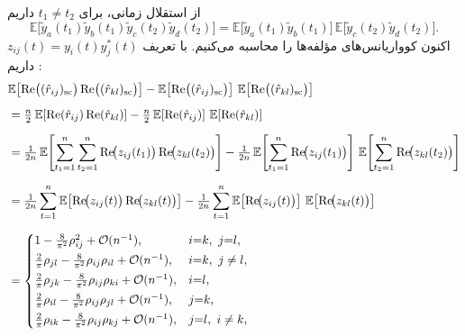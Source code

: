\begin{اثبات}
	از استقلال زمانی، برای \(t_1\neq t_2\) داریم
	\begin{equation}
		\mathbb{E}\!\big[\tilde y_a(t_1)\tilde y_b(t_1)\tilde y_c(t_2)\tilde y_d(t_2)\big]
		= \mathbb{E}\!\big[\tilde y_a(t_1)\tilde y_b(t_1)\big]\,
		\mathbb{E}\!\big[\tilde y_c(t_2)\tilde y_d(t_2)\big].
	\end{equation}
	اکنون کوواریانس‌های مؤلفه‌ها را محاسبه می‌کنیم. با تعریف \(z_{ij}(t)=y_i(t)y_j^{*}(t)\) داریم :
	\begin{align}
		&\mathbb{E}\!\left[\mathrm{Re}\big((\hat r_{ij})_{\mathrm{sc}}\big)\,
		\mathrm{Re}\big((\hat r_{kl})_{\mathrm{sc}}\big)\right]
		- \mathbb{E}\!\left[\mathrm{Re}\big((\hat r_{ij})_{\mathrm{sc}}\big)\right]\,
		\mathbb{E}\!\left[\mathrm{Re}\big((\hat r_{kl})_{\mathrm{sc}}\big)\right] \notag \\[6pt]
		&= \tfrac{n}{2}\,\mathbb{E}\!\left[\mathrm{Re}(\hat r_{ij})\,\mathrm{Re}(\hat r_{kl})\right]
		- \tfrac{n}{2}\,\mathbb{E}\!\left[\mathrm{Re}(\hat r_{ij})\right]\,
		\mathbb{E}\!\left[\mathrm{Re}(\hat r_{kl})\right] \notag \\[6pt] 
		&= \tfrac{1}{2n}\,
		\mathbb{E}\!\left[
		\sum_{t_{1}=1}^{n}\sum_{t_{2}=1}^{n}
		\mathrm{Re}\!\big(z_{ij}(t_{1})\big)\,
		\mathrm{Re}\!\big(z_{kl}(t_{2})\big)
		\right] - \tfrac{1}{2n}\,
		\mathbb{E}\!\left[\sum_{t_{1}=1}^{n}\mathrm{Re}\!\big(z_{ij}(t_{1})\big)\right]\,
		\mathbb{E}\!\left[\sum_{t_{2}=1}^{n}\mathrm{Re}\!\big(z_{kl}(t_{2})\big)\right] \notag \\[6pt]
		&= \tfrac{1}{2n}\sum_{t=1}^{n}\mathbb{E}\!\left[
		\mathrm{Re}\!\big(z_{ij}(t)\big)\,
		\mathrm{Re}\!\big(z_{kl}(t)\big)\right]
		- \tfrac{1}{2n}\sum_{t=1}^{n}\mathbb{E}\!\left[\mathrm{Re}\!\big(z_{ij}(t)\big)\right]\,
		\mathbb{E}\!\left[\mathrm{Re}\!\big(z_{kl}(t)\big)\right] \notag \\[6pt]
		&=\begin{cases}
			1-\tfrac{8}{\pi^{2}}\rho_{ij}^{2}+\mathcal{O}(n^{-1}), & i{=}k,~j{=}l,\\[2pt]
			\tfrac{2}{\pi}\rho_{jl}-\tfrac{8}{\pi^{2}}\rho_{ij}\rho_{il}+\mathcal{O}(n^{-1}), & i{=}k,~j\neq l,\\[2pt]
			\tfrac{2}{\pi}\rho_{jk}-\tfrac{8}{\pi^{2}}\rho_{ij}\rho_{ki}+\mathcal{O}(n^{-1}), & i{=}l,\\[2pt]
			\tfrac{2}{\pi}\rho_{il}-\tfrac{8}{\pi^{2}}\rho_{ij}\rho_{jl}+\mathcal{O}(n^{-1}), & j{=}k,\\[2pt]
			\tfrac{2}{\pi}\rho_{ik}-\tfrac{8}{\pi^{2}}\rho_{ij}\rho_{kj}+\mathcal{O}(n^{-1}), & j{=}l,~i\neq k,\\[2pt]

\end{cases}
\end{align}
\end{اثبات}
